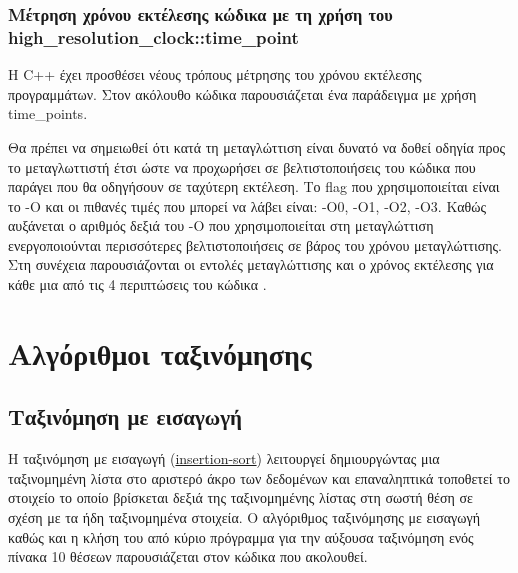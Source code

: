 



\subsubsection{Μέτρηση χρόνου εκτέλεσης κώδικα με τη χρήση του high\_resolution\_clock::time\_point}
Η C++ έχει προσθέσει νέους τρόπους μέτρησης του χρόνου εκτέλεσης προγραμμάτων. Στον ακόλουθο κώδικα παρουσιάζεται ένα παράδειγμα με χρήση time\_points.





Θα πρέπει να σημειωθεί ότι κατά τη μεταγλώττιση είναι δυνατό να δοθεί οδηγία προς το μεταγλωττιστή έτσι ώστε να προχωρήσει σε βελτιστοποιήσεις του κώδικα που παράγει που θα οδηγήσουν σε ταχύτερη εκτέλεση. Το flag που χρησιμοποιείται είναι το -Ο και οι πιθανές τιμές που μπορεί να λάβει είναι: -Ο0, -Ο1, -Ο2, -Ο3. Καθώς αυξάνεται ο αριθμός δεξιά του -Ο που χρησιμοποιείται στη μεταγλώττιση ενεργοποιούνται περισσότερες βελτιστοποιήσεις σε βάρος του χρόνου μεταγλώττισης. Στη συνέχεια παρουσιάζονται οι εντολές μεταγλώττισης και ο χρόνος εκτέλεσης για κάθε μια από τις 4 περιπτώσεις του κώδικα .




\section{Αλγόριθμοι ταξινόμησης}
\subsection{Ταξινόμηση με εισαγωγή}
Η ταξινόμηση με εισαγωγή (\href{http://rosettacode.org/wiki/Sorting_algorithms/Insertion_sort}{insertion-sort}) λειτουργεί δημιουργώντας μια ταξινομημένη λίστα στο αριστερό άκρο των δεδομένων και επαναληπτικά τοποθετεί το στοιχείο το οποίο βρίσκεται δεξιά της ταξινομημένης λίστας στη σωστή θέση σε σχέση με τα ήδη ταξινομημένα στοιχεία. Ο αλγόριθμος ταξινόμησης με εισαγωγή καθώς και η κλήση του από κύριο πρόγραμμα για την αύξουσα ταξινόμηση ενός πίνακα 10 θέσεων παρουσιάζεται στον κώδικα που ακολουθεί.

